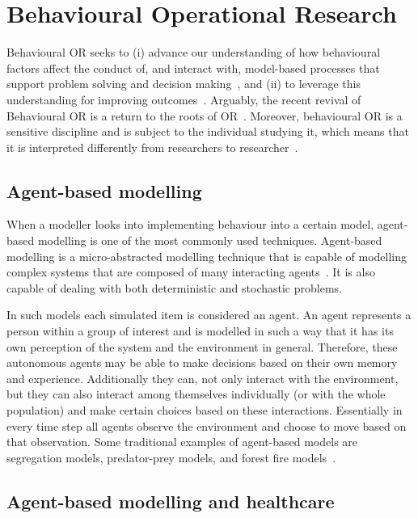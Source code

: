 \section{Behavioural Operational Research}
\label{sec:lit_review_behavioural_modelling}

Behavioural OR seeks to (i) advance our understanding of how behavioural
factors affect the conduct of, and interact with, model-based processes that
support problem solving and decision making~\cite{kunc2020review}, and (ii) to
leverage this understanding for improving
outcomes~\cite{hamalainen2013importance}.
Arguably, the recent revival of Behavioural OR is a return to the roots of
OR~\cite{franco2016engaging}.
Moreover, behavioural OR is a sensitive discipline and is subject to the
individual studying it, which means that it is interpreted differently from
researchers to researcher~\cite{hacking1983representing}.

\subsection{Agent-based modelling}
When a modeller looks into implementing behaviour into a certain model,
agent-based modelling is one of the most commonly used techniques.
Agent-based modelling is a micro-abstracted modelling technique that is
capable of modelling complex systems that are composed of many interacting
agents~\cite{greasley2016behavior, jackson2017agent}.
It is also capable of dealing with both deterministic and stochastic
problems.

In such models each simulated item is considered an agent.
An agent represents a person within a group of interest and is modelled in such
a way that it has its own perception of the system and the environment in
general.
Therefore, these autonomous agents may be able to make decisions based on their
own memory and experience.
Additionally they can, not only interact with the environment, but they can
also interact among themselves individually (or with the whole population) and
make certain choices based on these interactions.
Essentially in every time step all agents observe the environment and choose to
move based on that observation.
Some traditional examples of agent-based models are segregation models,
predator-prey models, and forest fire models~\cite{jackson2017agent}.


\subsection{Agent-based modelling and healthcare}

